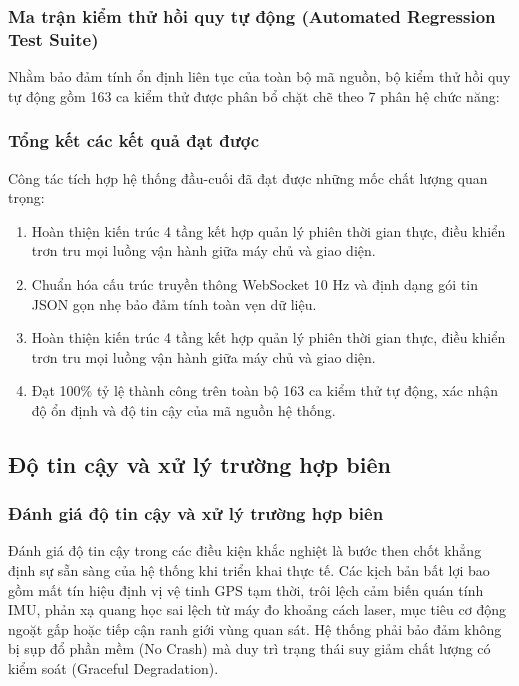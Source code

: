 \subsubsection{Ma trận kiểm thử hồi quy tự động (Automated Regression Test Suite)}

\hspace{0.5cm} Nhằm bảo đảm tính ổn định liên tục của toàn bộ mã nguồn, bộ kiểm thử hồi quy tự động gồm 163 ca kiểm thử được phân bổ chặt chẽ theo 7 phân hệ chức năng:

\subsubsection{Tổng kết các kết quả đạt được}

\hspace{0.5cm} Công tác tích hợp hệ thống đầu-cuối đã đạt được những mốc chất lượng quan trọng:
\begin{enumerate}
    \item Hoàn thiện kiến trúc 4 tầng kết hợp quản lý phiên thời gian thực, điều khiển trơn tru mọi luồng vận hành giữa máy chủ và giao diện.
    \item Chuẩn hóa cấu trúc truyền thông WebSocket 10 Hz và định dạng gói tin JSON gọn nhẹ bảo đảm tính toàn vẹn dữ liệu.
    \item Hoàn thiện kiến trúc 4 tầng kết hợp quản lý phiên thời gian thực, điều khiển trơn tru mọi luồng vận hành giữa máy chủ và giao diện.
    \item Đạt 100\% tỷ lệ thành công trên toàn bộ 163 ca kiểm thử tự động, xác nhận độ ổn định và độ tin cậy của mã nguồn hệ thống.
\end{enumerate}

\subsection{Độ tin cậy và xử lý trường hợp biên}

\subsubsection{Đánh giá độ tin cậy và xử lý trường hợp biên}

\hspace{0.5cm} Đánh giá độ tin cậy trong các điều kiện khắc nghiệt là bước then chốt khẳng định sự sẵn sàng của hệ thống khi triển khai thực tế. Các kịch bản bất lợi bao gồm mất tín hiệu định vị vệ tinh GPS tạm thời, trôi lệch cảm biến quán tính IMU, phản xạ quang học sai lệch từ máy đo khoảng cách laser, mục tiêu cơ động ngoặt gấp hoặc tiếp cận ranh giới vùng quan sát. Hệ thống phải bảo đảm không bị sụp đổ phần mềm (No Crash) mà duy trì trạng thái suy giảm chất lượng có kiểm soát (Graceful Degradation).

